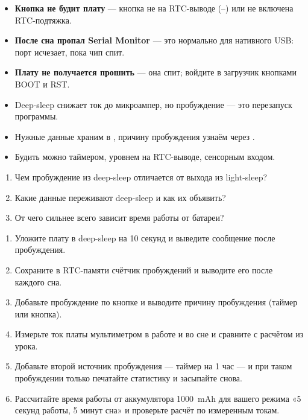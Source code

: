 

\begin{trouble}
\begin{itemize}[leftmargin=*]
  \item \textbf{Кнопка не будит плату} --- кнопка не на RTC-выводе (--) или не включена RTC-подтяжка.
  \item \textbf{После сна пропал Serial Monitor} --- это нормально для нативного USB: порт исчезает, пока чип спит.
  \item \textbf{Плату не получается прошить} --- она спит; войдите в загрузчик кнопками BOOT и RST.
\end{itemize}
\end{trouble}

\begin{summary}
\begin{itemize}[leftmargin=*]
  \item Deep-sleep снижает ток до микроампер, но пробуждение --- это перезапуск программы.
  \item Нужные данные храним в , причину пробуждения узнаём через .
  \item Будить можно таймером, уровнем на RTC-выводе, сенсорным входом.
\end{itemize}
\end{summary}

\begin{selfcheck}
\begin{enumerate}
  \item Чем пробуждение из deep-sleep отличается от выхода из light-sleep?
  \item Какие данные переживают deep-sleep и как их объявить?
  \item От чего сильнее всего зависит время работы от батареи?
\end{enumerate}
\end{selfcheck}

\begin{tasks}
\begin{enumerate}
\item {} Уложите плату в deep-sleep на 10 секунд и выведите сообщение после пробуждения.
\item {} Сохраните в RTC-памяти счётчик пробуждений и выводите его после каждого сна.
\item {} Добавьте пробуждение по кнопке и выводите причину пробуждения (таймер или кнопка).
\item {} Измерьте ток платы мультиметром в работе и во сне и сравните с расчётом из урока.
\item {} Добавьте второй источник пробуждения --- таймер на 1 час --- и при таком пробуждении только печатайте статистику и засыпайте снова.
\item {} Рассчитайте время работы от аккумулятора \SI{1000}{mAh} для вашего режима «5 секунд работы, 5 минут сна» и проверьте расчёт по измеренным токам.
\end{enumerate}
\end{tasks}
